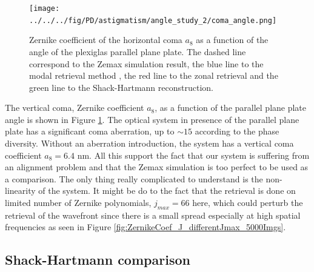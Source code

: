 \begin{figure}
\begin{center}
\texttt{[image: ../../../fig/PD/astigmatism/angle\_study\_2/coma\_angle.png]}
\decoRule
\caption{Zernike coefficient of the horizontal coma $a_8$ as a function of the angle of the plexiglas parallel plane plate. The dashed line correspond to the Zemax simulation result, the blue line to the modal retrieval method , the red line to the zonal retrieval and the green line to the Shack-Hartmann reconstruction.}
\label{fig:a8astigmatism_angle_Diversity}
\end{center}
\end{figure}

The vertical coma, Zernike coefficient $a_8$, as a function of the parallel plane plate angle is shown in Figure \ref{fig:a8astigmatism_angle_Diversity}. The optical system in presence of the parallel plane plate has a significant coma aberration, up to $\sim15$ according to the phase diversity. Without an aberration introduction, the system has a vertical coma coefficient $a_8=6.4$ nm. All this support the fact that our system is suffering from an alignment problem and that the Zemax simulation is too perfect to be used as a comparison. The only thing really complicated to understand is the non-linearity of the system. It might be do to the fact that the retrieval is done on limited number of Zernike polynomials, $j_{max}=66$ here, which could perturb the retrieval of the wavefront since there is a small spread especially at high spatial frequencies as seen in Figure \ref{fig:ZernikeCoef_J_differentJmax_5000Imgs}. 

\subsection{Shack-Hartmann comparison}


